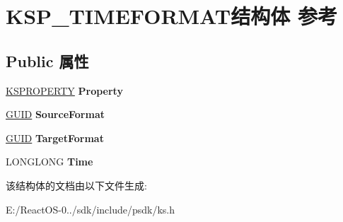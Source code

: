 \hypertarget{struct_k_s_p___t_i_m_e_f_o_r_m_a_t}{}\section{K\+S\+P\+\_\+\+T\+I\+M\+E\+F\+O\+R\+M\+A\+T结构体 参考}
\label{struct_k_s_p___t_i_m_e_f_o_r_m_a_t}
\subsection*{Public 属性}
\begin{DoxyCompactItemize}
\item 
\mbox{\label{struct_k_s_p___t_i_m_e_f_o_r_m_a_t_ae3301052a532d98ac61e13fc19010d68}} 
\hyperlink{struct_k_s_i_d_e_n_t_i_f_i_e_r}{K\+S\+P\+R\+O\+P\+E\+R\+TY} {\bfseries Property}
\item 
\mbox{\label{struct_k_s_p___t_i_m_e_f_o_r_m_a_t_af7fca0d5afc6d890295e36753e5e386c}} 
\hyperlink{interface_g_u_i_d}{G\+U\+ID} {\bfseries Source\+Format}
\item 
\mbox{\label{struct_k_s_p___t_i_m_e_f_o_r_m_a_t_a6ec0ce402b19025bbc62013c9403e1b5}} 
\hyperlink{interface_g_u_i_d}{G\+U\+ID} {\bfseries Target\+Format}
\item 
\mbox{\label{struct_k_s_p___t_i_m_e_f_o_r_m_a_t_a189ecd34871a3d0930ceb4a81b2605e0}} 
L\+O\+N\+G\+L\+O\+NG {\bfseries Time}
\end{DoxyCompactItemize}


该结构体的文档由以下文件生成\+:\begin{DoxyCompactItemize}
\item 
E\+:/\+React\+O\+S-\/0../sdk/include/psdk/ks.\+h\end{DoxyCompactItemize}

